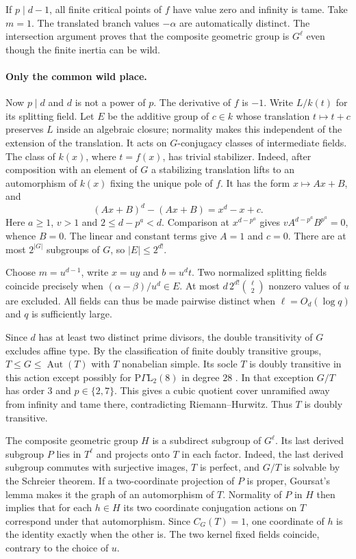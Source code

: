 \documentclass[preprint,12pt,numbers]{elsarticle}
\begin{document}
If $p\mid d-1$, all finite critical points of $f$ have value zero and
infinity is tame. Take $m=1$. The translated branch values $-\alpha$
are automatically distinct. The intersection argument proves that the
composite geometric group is $G^\ell$ even though the finite inertia
can be wild.

\paragraph{Only the common wild place.}
Now $p\mid d$ and $d$ is not a power of $p$. The derivative of $f$ is
$-1$. Write $L/k(t)$ for its splitting field. Let $E$ be the additive
group of $c\in k$ whose translation $t\mapsto t+c$ preserves $L$
inside an algebraic closure; normality makes this independent of the
extension of the translation. It acts on $G$-conjugacy classes of
intermediate fields. The class of $k(x)$, where $t=f(x)$, has trivial
stabilizer. Indeed, after composition with an element of $G$ a
stabilizing translation lifts to an automorphism of $k(x)$ fixing the
unique pole of $f$. It has the form $x\mapsto A x+B$, and
\[
             (Ax+B)^d-(Ax+B)=x^d-x+c .
\]
Here $a\ge1$, $v>1$ and $2\le d-p^a<d$. Comparison at $x^{d-p^a}$
gives $vA^{d-p^a}B^{p^a}=0$, whence $B=0$. The linear and constant
terms give $A=1$ and $c=0$. There are at most $2^{|G|}$ subgroups of
$G$, so $|E|\le2^{d!}$.

Choose $m=u^{d-1}$, write $x=uy$ and $b=u^dt$. Two normalized
splitting fields coincide precisely when $(\alpha-\beta)/u^d\in E$.
At most $d\,2^{d!}\binom{\ell}{2}$ nonzero values of $u$ are excluded.
All fields can thus be made pairwise distinct when $\ell=O_d(\log q)$
and $q$ is sufficiently large.

Since $d$ has at least two distinct prime divisors, the double
transitivity of $G$ excludes affine type. By the classification of
finite doubly transitive groups, $T\le G\le\operatorname{Aut}(T)$ with
$T$ nonabelian simple. Its socle $T$ is doubly transitive in this action
except possibly for $\mathrm{P}\Gamma\mathrm L_2(8)$ in degree $28$
\cite[\S2.2]{Reid}. In that exception $G/T$ has order $3$ and
$p\in\{2,7\}$. This gives a cubic quotient cover unramified away from
infinity and tame there, contradicting Riemann--Hurwitz. Thus $T$
is doubly transitive.

The composite geometric group $H$ is a subdirect subgroup of $G^\ell$.
Its last derived subgroup $P$ lies in $T^\ell$ and projects onto $T$
in each factor. Indeed, the last derived subgroup commutes with
surjective images, $T$ is perfect, and $G/T$ is solvable by the
Schreier theorem. If a two-coordinate projection of $P$ is proper,
Goursat's lemma makes it the graph of an automorphism of $T$.
Normality of $P$ in $H$ then implies that for each $h\in H$ its two
coordinate conjugation actions on $T$ correspond under that
automorphism. Since $C_G(T)=1$, one coordinate of $h$ is the identity
exactly when the other is. The two kernel fixed fields coincide,
contrary to the choice of $u$.
\end{document}
